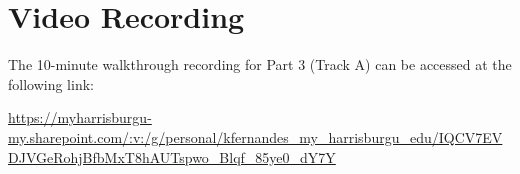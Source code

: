 \documentclass[11pt]{article}
\begin{document}
\section{Video Recording}

The 10-minute walkthrough recording for Part 3 (Track A) can be accessed at the following link:

\url{https://myharrisburgu-my.sharepoint.com/:v:/g/personal/kfernandes_my_harrisburgu_edu/IQCV7EVDJVGeRohjBfbMxT8hAUTspwo_Blqf_85ye0_dY7Y}
\end{document}
